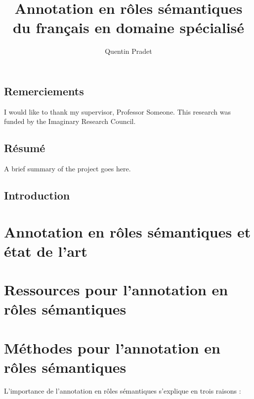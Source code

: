 \documentclass[oneside,parskip]{scrbook}
\title{Annotation en rôles sémantiques du français en domaine spécialisé}
\author{Quentin Pradet}
\date{}
\begin{document}
\maketitle

\frontmatter
\tableofcontents
\listoffigures
\listoftables

\chapter{Remerciements}

I would like to thank my supervisor, Professor Someone. This
research was funded by the Imaginary Research Council.

\chapter{Résumé}

A brief summary of the project goes here.


\mainmatter

\chapter{Introduction}
\label{ch:intro}

\part{Annotation en rôles sémantiques et état de l'art}





\part{Ressources pour l'annotation en rôles sémantiques}





\part{Méthodes pour l'annotation en rôles sémantiques}

L'importance de l'annotation en rôles sémantiques s'explique en trois raisons :
\end{document}
